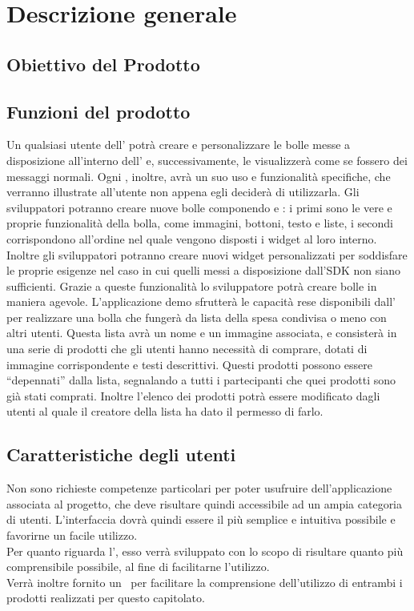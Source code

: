 \section{Descrizione generale}
\subsection{Obiettivo del Prodotto}
\scopoProdotto

\subsection{Funzioni del prodotto}
Un qualsiasi utente dell' potrà creare e personalizzare le bolle messe a disposizione all'interno dell' e, successivamente, le visualizzerà come se fossero dei messaggi normali. Ogni , inoltre, avrà un suo uso e funzionalità specifiche, che verranno illustrate all'utente non appena egli deciderà di utilizzarla. Gli sviluppatori potranno creare nuove bolle componendo  e : i primi sono le vere e proprie funzionalità della bolla, come immagini, bottoni, testo e liste, i secondi corrispondono all’ordine nel quale vengono disposti i widget al loro interno. Inoltre gli sviluppatori potranno creare nuovi widget personalizzati per soddisfare le proprie esigenze nel caso in cui quelli messi a disposizione dall’SDK non siano sufficienti. Grazie a queste funzionalità lo sviluppatore potrà creare bolle in maniera agevole.
L'applicazione demo sfrutterà le capacità rese disponibili dall' per realizzare una bolla che fungerà da lista della spesa condivisa o meno con altri utenti. Questa lista avrà un nome e un immagine associata, e  consisterà in una serie di prodotti che gli utenti hanno necessità di comprare, dotati di immagine corrispondente e testi descrittivi. Questi prodotti  possono essere “depennati” dalla lista, segnalando a tutti i partecipanti che quei prodotti sono già stati comprati. Inoltre l’elenco dei prodotti potrà essere modificato dagli utenti al quale il creatore della lista ha dato il permesso di farlo.

\subsection{Caratteristiche degli utenti}
Non sono richieste competenze particolari per poter usufruire dell'applicazione associata al progetto, che deve risultare quindi accessibile ad un ampia categoria di utenti. L'interfaccia dovrà quindi essere il più semplice e intuitiva possibile e favorirne un facile utilizzo. \\
Per quanto riguarda l', esso verrà sviluppato con lo scopo di risultare quanto più comprensibile possibile, al fine di facilitarne l'utilizzo. \\
Verrà inoltre fornito un \MU\ per facilitare la comprensione dell'utilizzo di entrambi i prodotti realizzati per questo capitolato.

